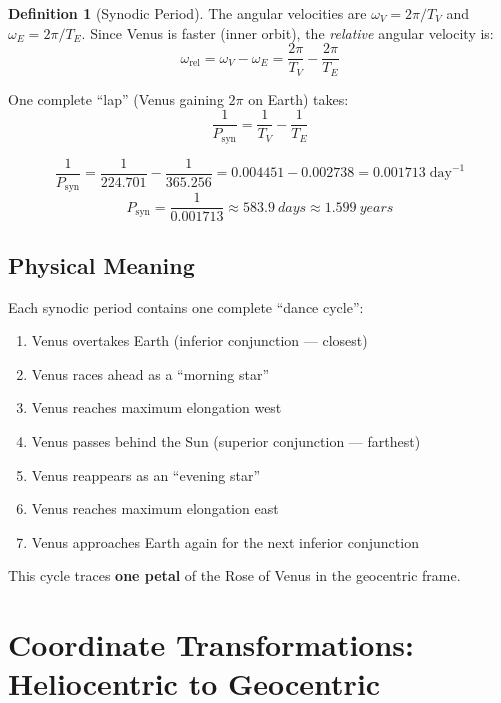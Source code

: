 \documentclass[11pt,letterpaper]{article}
\theoremstyle{definition}
\newtheorem{definition}{Definition}[section]
\theoremstyle{plain}
\theoremstyle{remark}
\begin{document}
\begin{definition}[Synodic Period]
The angular velocities are $\omega_V = 2\pi/T_V$ and
$\omega_E = 2\pi/T_E$. Since Venus is faster (inner orbit),
the \textit{relative} angular velocity is:
\begin{equation}
  \omega_{\text{rel}} = \omega_V - \omega_E
  = \frac{2\pi}{T_V} - \frac{2\pi}{T_E}
\end{equation}

One complete ``lap'' (Venus gaining $2\pi$ on Earth) takes:
\begin{equation}
  \boxed{
    \frac{1}{P_{\text{syn}}}
    = \frac{1}{T_V} - \frac{1}{T_E}
  }
  \label{eq:synodic}
\end{equation}
\end{definition}

\begin{keyresult}
\[
  \frac{1}{P_{\text{syn}}}
  = \frac{1}{224.701} - \frac{1}{365.256}
  = 0.004451 - 0.002738
  = 0.001713\;\text{day}^{-1}
\]
\[
  P_{\text{syn}} = \frac{1}{0.001713} \approx \SI{583.9}{days}
  \approx \SI{1.599}{years}
\]
\end{keyresult}


\subsection{Physical Meaning}

Each synodic period contains one complete ``dance cycle'':
\begin{enumerate}[nosep]
  \item Venus overtakes Earth (inferior conjunction — closest)
  \item Venus races ahead as a ``morning star''
  \item Venus reaches maximum elongation west
  \item Venus passes behind the Sun (superior conjunction — farthest)
  \item Venus reappears as an ``evening star''
  \item Venus reaches maximum elongation east
  \item Venus approaches Earth again for the next inferior conjunction
\end{enumerate}

This cycle traces \textbf{one petal} of the Rose of Venus in the
geocentric frame.


\section{Coordinate Transformations: Heliocentric to Geocentric}
\label{sec:transform}
\end{document}

